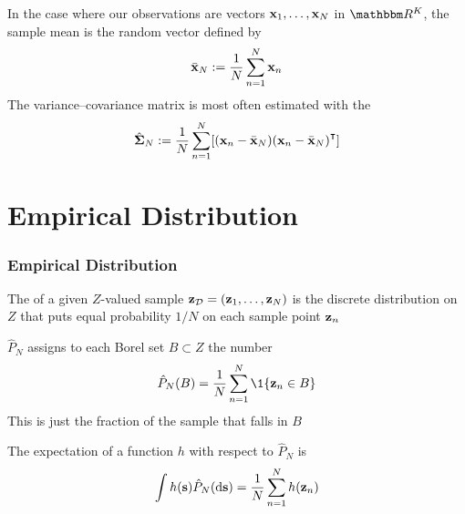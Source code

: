 \begin{frame}
    
    \vspace{2em}
    \Eg
    In the case where our observations are vectors ${\mathbf x}_1,\ldots,{\mathbf x}_N$ in
    $\RR^K$, the sample mean is the random vector defined by
    \begin{equation*}
        \bar {{\mathbf x}}_N := \frac{1}{N} \sum_{n=1}^N {\mathbf x}_n 
    \end{equation*}
    The variance--covariance matrix is most often
    estimated with the  
    \begin{equation*}
        \hboldSigma_N := \frac{1}{N} \sum_{n=1}^N 
            [ (\boldx_n - \bar \boldx_N) (\boldx_n - \bar \boldx_N)^\T]
    \end{equation*}
    
\end{frame}

\section{Empirical Distribution}

\begin{frame}\frametitle{Empirical Distribution}

    \vspace{2em}
    The  of a given $Z$-valued sample $\mathbf{z}_{\mathcal D} = ({\mathbf z}_1,
    \ldots, {\mathbf z}_N)$ is the discrete distribution on $Z$ that puts equal
    probability $1/N$ on each sample point ${\mathbf z}_n$
    
    \vspace{.7em}
    $\hat P_N$ assigns to each Borel set $B \subset Z$ 
    the number
    \begin{equation*}
        \label{eq:dempd}
        \hat P_N(B) = \frac{1}{N} \sum_{n=1}^N \1\{\boldz_n \in B\}
    \end{equation*}
    This is just the fraction of the sample that falls in $B$
    
\end{frame}

\begin{frame}
    
    \vspace{2em}
    The expectation of a function $h$
    with respect to $\hat P_N$ is
    \begin{equation*}
        \label{eq:expue}
        \int h({\mathbf s}) \hat P_N(\mathop{}\!\mathrm{d} {\mathbf s}) = \frac{1}{N} \sum_{n=1}^N h({\mathbf z}_n) 
    \end{equation*}


\end{frame}

